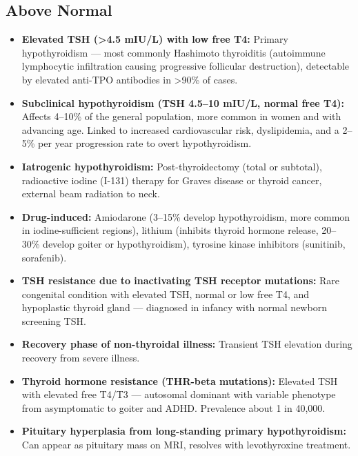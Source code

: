 \subsection*{Above Normal}
\begin{itemize}
  \item \textbf{Elevated TSH (>4.5 mIU/L) with low free T4:} Primary hypothyroidism --- most commonly Hashimoto thyroiditis (autoimmune lymphocytic infiltration causing progressive follicular destruction), detectable by elevated anti-TPO antibodies in >90\% of cases.
  \item \textbf{Subclinical hypothyroidism (TSH 4.5--10 mIU/L, normal free T4):} Affects 4--10\% of the general population, more common in women and with advancing age. Linked to increased cardiovascular risk, dyslipidemia, and a 2--5\% per year progression rate to overt hypothyroidism.
  \item \textbf{Iatrogenic hypothyroidism:} Post-thyroidectomy (total or subtotal), radioactive iodine (I-131) therapy for Graves disease or thyroid cancer, external beam radiation to neck.
  \item \textbf{Drug-induced:} Amiodarone (3--15\% develop hypothyroidism, more common in iodine-sufficient regions), lithium (inhibits thyroid hormone release, 20--30\% develop goiter or hypothyroidism), tyrosine kinase inhibitors (sunitinib, sorafenib).
  \item \textbf{TSH resistance due to inactivating TSH receptor mutations:} Rare congenital condition with elevated TSH, normal or low free T4, and hypoplastic thyroid gland --- diagnosed in infancy with normal newborn screening TSH.
  \item \textbf{Recovery phase of non-thyroidal illness:} Transient TSH elevation during recovery from severe illness.
  \item \textbf{Thyroid hormone resistance (THR-beta mutations):} Elevated TSH with elevated free T4/T3 --- autosomal dominant with variable phenotype from asymptomatic to goiter and ADHD. Prevalence about 1 in 40,000.
  \item \textbf{Pituitary hyperplasia from long-standing primary hypothyroidism:} Can appear as pituitary mass on MRI, resolves with levothyroxine treatment.
\end{itemize}

